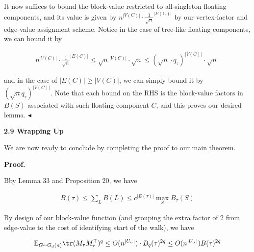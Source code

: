 It now suffices to bound the block-value restricted to all-singleton floating components, and its value is given by $n^{|V(C)|}\cdot\frac{1}{\sqrt{n}}^{|E(C)|}$ by our vertex-factor and edge-value assignment scheme. Notice in the case of tree-like floating components, we can bound it by\par


\[\begin{gathered}
n^{|V(C)|}\cdot\frac{1}{\sqrt{n}}^{|E(C)|}\leq\sqrt{n}^{|V(C)|}\cdot\sqrt{n}\leq(\sqrt{n}\cdot q_{\tau})^{|V(C)|}\cdot\sqrt{n}\
\end{gathered}\]


and in the case of $|E(C)|\geq|V(C)|$, we can simply bound it by $(\sqrt{n}q_{\tau})^{|V(C)|}$. Note that each bound on the RHS is the block-value factors in $B(S)$ associated with such floating component $C$, and this proves our desired lemma.
$\blacktriangleleft$\par






\par\medskip\noindent\textbf{
2.9 Wrapping Up}\par




We are now ready to conclude by completing the proof to our main theorem.\par




\par\medskip\noindent\textbf{Proof.}\par




Bby Lemma 33 and Proposition 20, we have\par


\[\begin{gathered}
\displaystyle B(\tau)\leq\sum_{L}B(L)\leq c^{|E(\tau)|}\max_{S}B_{\tau}(S)
\end{gathered}\]




By design of our block-value function (and grouping the extra factor of $2$ from edge-value to the cost of identifying start of the walk), we have\par


\[\begin{gathered}
\mathbb{E}_{G\sim G_{d}(n)}\tr(M_{\tau}M_{\tau}^{\top})^{q}\leq O(n^{|U_{\alpha}|})\cdot B_{q}(\tau)^{2q}\leq O(n^{|U_{\alpha}|})B(\tau)^{2q}
\end{gathered}\]


